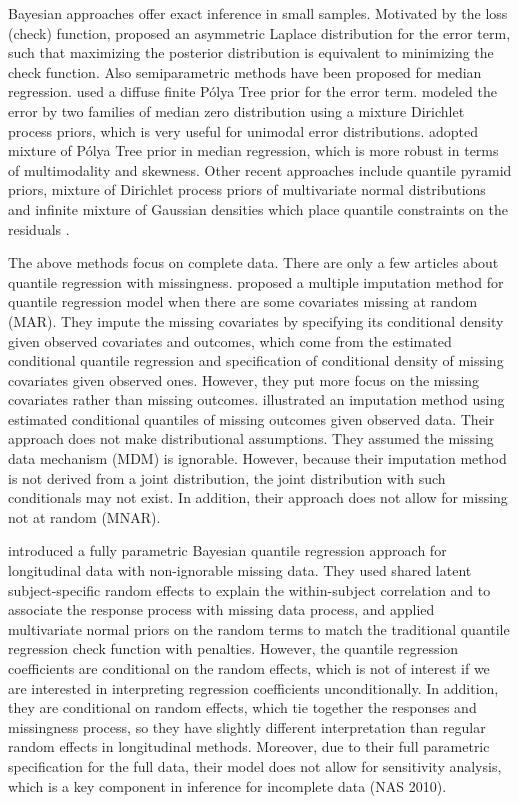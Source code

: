 \documentclass[useAMS,usenatbib,referee]{enar}
\newcommand{\polya}{P\'{o}lya} \newcommand{\yobs}{\bmath y_{\itl{obs}}}
\begin{document}
Bayesian approaches offer exact inference in small samples. Motivated
by the loss (check) function, \citet{yu2001} proposed an asymmetric
Laplace distribution for the error term, such that maximizing the
posterior distribution is equivalent to minimizing the check function.
Also semiparametric methods have been proposed for median
regression. \citet{walker1999} used a diffuse finite \polya{} Tree
prior for the error term. \citet{kottas2001} modeled the error by two
families of median zero distribution using a mixture Dirichlet process
priors, which is very useful for unimodal error
distributions. \citet{hanson2002} adopted mixture of \polya{} Tree
prior in median regression, which is more robust in terms of
multimodality and skewness. Other recent approaches include quantile
pyramid priors, mixture of Dirichlet process priors of multivariate
normal distributions and infinite mixture of Gaussian densities which
place quantile constraints on the residuals \citep{hjort2007,
  hjort2009, kottas2009,reich2010}.

The above methods focus on complete data.  There are only a few
articles about quantile regression with missingness.  \citet{wei2012}
proposed a multiple imputation method for quantile regression model
when there are some covariates missing at random (MAR). They impute
the missing covariates by specifying its conditional density given
observed covariates and outcomes, which come from the estimated
conditional quantile regression and specification of conditional
density of missing covariates given observed ones.  However, they put
more focus on the missing covariates rather than missing outcomes.
\citet{bottai2013} illustrated an imputation method using estimated
conditional quantiles of missing outcomes given observed data. Their
approach does not make distributional assumptions.  They assumed the
missing data mechanism (MDM) is ignorable. However, because their
imputation method is not derived from a joint distribution, the joint
distribution with such conditionals may not exist.  In addition, their
approach does not allow for missing not at random (MNAR).

\citet{yuan2010} introduced a fully parametric Bayesian quantile
regression approach for longitudinal data with non-ignorable missing
data. They used shared latent subject-specific random effects to
explain the within-subject correlation and to associate the response
process with missing data process, and applied multivariate normal
priors on the random terms to match the traditional quantile
regression check function with penalties. However, the quantile
regression coefficients are conditional on the random effects, which
is not of interest if we are interested in interpreting regression
coefficients unconditionally.  In addition, they are
conditional on random effects, which tie together the responses and
missingness process, so they have slightly different interpretation
than regular random effects in longitudinal methods. Moreover, due to
their full parametric specification for the full data, their model
does not allow for sensitivity analysis, which is a key component in
inference for incomplete data (NAS 2010).
\end{document}

